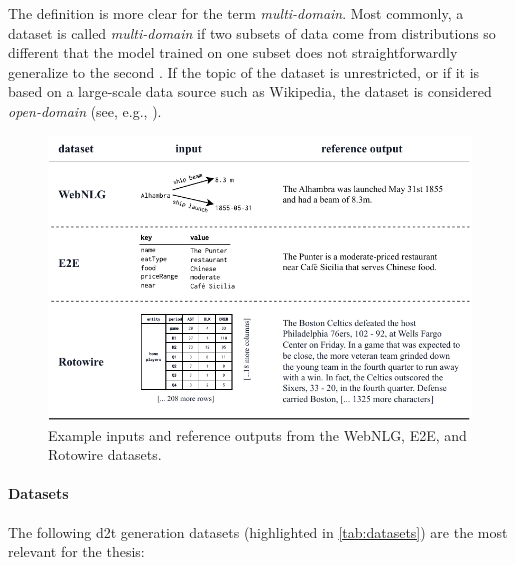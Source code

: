 {The definition is more clear for the term \emph{multi-domain}. Most commonly, a dataset is called \emph{multi-domain} if two subsets of data come from distributions so different that the model trained on one subset does not straightforwardly generalize to the second \cite{vanderleeCACAPODatasetMultilingual2020,budzianowskiMultiWOZLargeScaleMultiDomain2020,rastogiScalableMultiDomainConversational2020}. If the topic of the dataset is unrestricted, or if it is based on a large-scale data source such as Wikipedia, the dataset is considered \emph{open-domain} (see, e.g., \citealp{chenLogicalNaturalLanguage2020,nan2021dart,kann2022open}).

\begin{figure}[ht]
    \centering
    \includegraphics[width=\textwidth]{img/datasets.pdf}
    \caption{Example inputs and reference outputs from the WebNLG, E2E, and Rotowire datasets.}\label{fig:datasets}
\end{figure}

\paragraph{Datasets} The following \ac{d2t} generation datasets (highlighted in \autoref{tab:datasets}) are the most relevant for the thesis:


}
